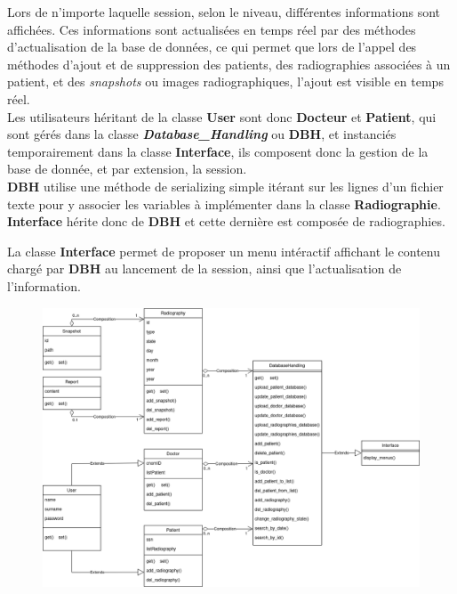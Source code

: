 \documentclass[12pt,a4paper]{article}
\begin{document}
\begin{multicols}{2}
		Lors de n'importe laquelle session, selon le niveau, différentes informations sont affichées. Ces informations sont actualisées en temps réel par des méthodes d'actualisation de la base de données, ce qui permet que lors de l'appel des méthodes d'ajout et de suppression des patients, des radiographies associées à un patient, et des \textit{snapshots} ou images radiographiques, l'ajout est visible en temps réel.\\
				
		Les utilisateurs héritant de la classe \textbf{User} sont donc \textbf{Docteur} et \textbf{Patient}, qui sont gérés dans la classe \textbf{\textit{Database\_Handling}} ou \textbf{DBH}, et instanciés temporairement dans la classe \textbf{Interface}, ils composent donc la gestion de la base de donnée, et par extension, la session. \\
				
		\textbf{DBH} utilise une méthode de serializing simple itérant sur les lignes d'un fichier texte pour y associer les variables à implémenter dans la classe \textbf{Radiographie}. \textbf{Interface} hérite donc de \textbf{DBH} et cette dernière est composée de radiographies.
				
		La classe \textbf{Interface} permet de proposer un menu intéractif affichant le contenu chargé par \textbf{DBH} au lancement de la session, ainsi que l'actualisation de l'information.
		
	\end{multicols}
	

	\begin{figure}[H]
		\centering
		\includegraphics[width=0.8\linewidth]{images/UML_OOP.png}
		\label{fig:UML}
	\end{figure}
\end{document}
